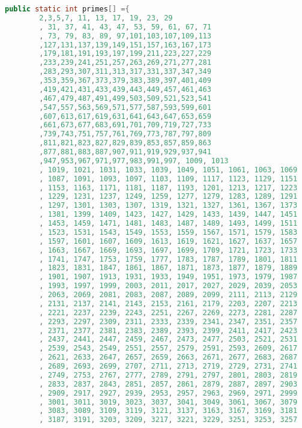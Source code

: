 \begin{solution}
\begin{lstlisting}[language=Java, caption="Java"]
	public static int primes[] ={
		2,3,5,7, 11, 13, 17, 19, 23, 29 
		, 31, 37, 41, 43, 47, 53, 59, 61, 67, 71 
		, 73, 79, 83, 89, 97,101,103,107,109,113 
		,127,131,137,139,149,151,157,163,167,173 
		,179,181,191,193,197,199,211,223,227,229 
		,233,239,241,251,257,263,269,271,277,281 
		,283,293,307,311,313,317,331,337,347,349 
		,353,359,367,373,379,383,389,397,401,409 
		,419,421,431,433,439,443,449,457,461,463 
		,467,479,487,491,499,503,509,521,523,541 
		,547,557,563,569,571,577,587,593,599,601 
		,607,613,617,619,631,641,643,647,653,659 
		,661,673,677,683,691,701,709,719,727,733 
		,739,743,751,757,761,769,773,787,797,809 
		,811,821,823,827,829,839,853,857,859,863 
		,877,881,883,887,907,911,919,929,937,941 
		,947,953,967,971,977,983,991,997, 1009, 1013 
		, 1019, 1021, 1031, 1033, 1039, 1049, 1051, 1061, 1063, 1069 
		, 1087, 1091, 1093, 1097, 1103, 1109, 1117, 1123, 1129, 1151 
		, 1153, 1163, 1171, 1181, 1187, 1193, 1201, 1213, 1217, 1223 
		, 1229, 1231, 1237, 1249, 1259, 1277, 1279, 1283, 1289, 1291 
		, 1297, 1301, 1303, 1307, 1319, 1321, 1327, 1361, 1367, 1373 
		, 1381, 1399, 1409, 1423, 1427, 1429, 1433, 1439, 1447, 1451 
		, 1453, 1459, 1471, 1481, 1483, 1487, 1489, 1493, 1499, 1511 
		, 1523, 1531, 1543, 1549, 1553, 1559, 1567, 1571, 1579, 1583 
		, 1597, 1601, 1607, 1609, 1613, 1619, 1621, 1627, 1637, 1657 
		, 1663, 1667, 1669, 1693, 1697, 1699, 1709, 1721, 1723, 1733 
		, 1741, 1747, 1753, 1759, 1777, 1783, 1787, 1789, 1801, 1811 
		, 1823, 1831, 1847, 1861, 1867, 1871, 1873, 1877, 1879, 1889 
		, 1901, 1907, 1913, 1931, 1933, 1949, 1951, 1973, 1979, 1987 
		, 1993, 1997, 1999, 2003, 2011, 2017, 2027, 2029, 2039, 2053 
		, 2063, 2069, 2081, 2083, 2087, 2089, 2099, 2111, 2113, 2129 
		, 2131, 2137, 2141, 2143, 2153, 2161, 2179, 2203, 2207, 2213 
		, 2221, 2237, 2239, 2243, 2251, 2267, 2269, 2273, 2281, 2287 
		, 2293, 2297, 2309, 2311, 2333, 2339, 2341, 2347, 2351, 2357 
		, 2371, 2377, 2381, 2383, 2389, 2393, 2399, 2411, 2417, 2423 
		, 2437, 2441, 2447, 2459, 2467, 2473, 2477, 2503, 2521, 2531 
		, 2539, 2543, 2549, 2551, 2557, 2579, 2591, 2593, 2609, 2617 
		, 2621, 2633, 2647, 2657, 2659, 2663, 2671, 2677, 2683, 2687 
		, 2689, 2693, 2699, 2707, 2711, 2713, 2719, 2729, 2731, 2741 
		, 2749, 2753, 2767, 2777, 2789, 2791, 2797, 2801, 2803, 2819 
		, 2833, 2837, 2843, 2851, 2857, 2861, 2879, 2887, 2897, 2903 
		, 2909, 2917, 2927, 2939, 2953, 2957, 2963, 2969, 2971, 2999 
		, 3001, 3011, 3019, 3023, 3037, 3041, 3049, 3061, 3067, 3079 
		, 3083, 3089, 3109, 3119, 3121, 3137, 3163, 3167, 3169, 3181 
		, 3187, 3191, 3203, 3209, 3217, 3221, 3229, 3251, 3253, 3257 

\end{lstlisting}
\end{solution}
